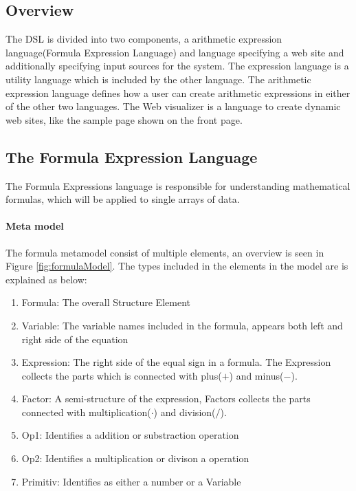 \subsection{Overview}
The DSL is divided into two components, a arithmetic expression language(Formula Expression
Language) and language specifying a web site and additionally specifying input sources for
the system. 
The expression language is a utility language which is included by the other language. 
The arithmetic expression language defines how a user can create arithmetic expressions in
either of the other two languages. 
The Web visualizer is a language to create dynamic web sites, like the sample page shown on
the front page.  

\subsection{The Formula Expression Language}
The Formula Expressions language is responsible for understanding mathematical formulas,
which will be applied to single arrays of data.
\paragraph{Meta model}

The formula metamodel consist of multiple elements, an overview is seen in Figure
\ref{fig:formulaModel}. The types included in the elements in the model are is explained as below:
\begin{enumerate}
\item Formula: The overall Structure Element
\item Variable: The variable names included in the formula, appears both left and right side of the equation
\item Expression: The right side of the equal sign in a formula. The Expression collects the parts which is connected with plus($+$) and minus($-$). 
\item Factor: A semi-structure of the expression, Factors collects the parts connected with multiplication($\cdot$) and division($/$).
\item Op1: Identifies a addition or substraction operation
\item Op2: Identifies a multiplication or divison a operation
\item Primitiv: Identifies as either a number or a Variable
\end{enumerate}

